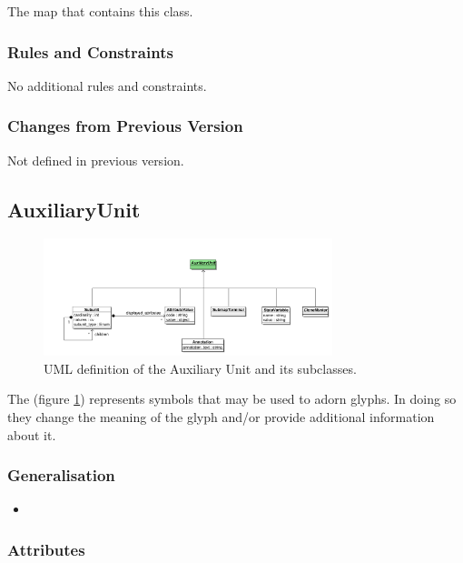 \begin{attributes}
 The map that contains this class.
\end{attributes}

\subsubsection{Rules and Constraints}

No additional rules and constraints.

\subsubsection{Changes from Previous Version}

Not defined in  previous version.


\subsection{AuxiliaryUnit}
\label{defn:AuxiliaryUnit}

\begin{figure}[htb]
  \centering
  \includegraphics[width=0.75\textwidth]{images/auxiliaryunituml}
\caption{UML definition of the Auxiliary Unit and its subclasses.}
  \label{fig:auxiliaryunituml}
\end{figure}

 The  (figure \ref{fig:auxiliaryunituml}) represents symbols that may be used to
adorn glyphs. In doing so they change the meaning of the glyph and/or provide
additional information about it.

\subsubsection{Generalisation}

\begin{itemize}
\item {}
\end{itemize}

\subsubsection{Attributes}

